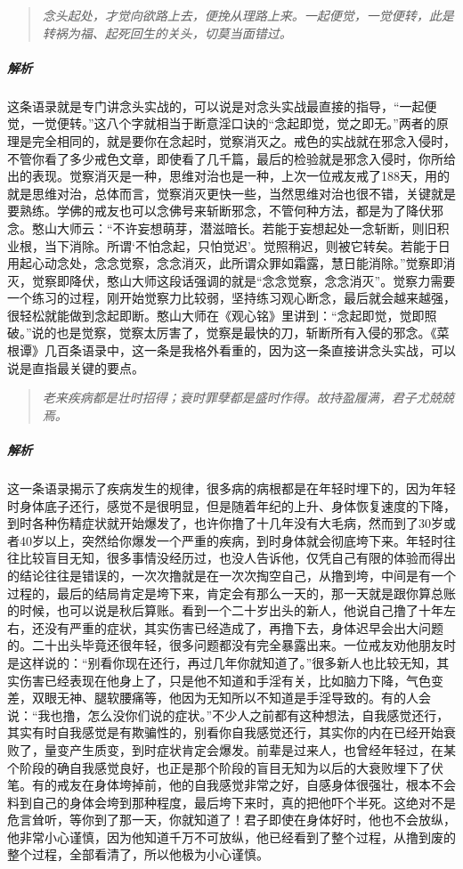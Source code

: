 \begin{quote}\it
    念头起处，才觉向欲路上去，便挽从理路上来。一起便觉，一觉便转，此是转祸为福、起死回生的关头，切莫当面错过。
\end{quote}

\subparagraph{解析} 这条语录就是专门讲念头实战的，可以说是对念头实战最直接的指导，“一起便觉，一觉便转。”这八个字就相当于断意淫口诀的“念起即觉，觉之即无。”两者的原理是完全相同的，就是要你在念起时，觉察消灭之。戒色的实战就在邪念入侵时，不管你看了多少戒色文章，即使看了几千篇，最后的检验就是邪念入侵时，你所给出的表现。觉察消灭是一种，思维对治也是一种，上次一位戒友戒了188天，用的就是思维对治，总体而言，觉察消灭更快一些，当然思维对治也很不错，关键就是要熟练。学佛的戒友也可以念佛号来斩断邪念，不管何种方法，都是为了降伏邪念。憨山大师云：“不许妄想萌芽，潜滋暗长。若能于妄想起处一念斩断，则旧积业根，当下消除。所谓‘不怕念起，只怕觉迟’。觉照稍迟，则被它转矣。若能于日用起心动念处，念念觉察，念念消灭，此所谓众罪如霜露，慧日能消除。”觉察即消灭，觉察即降伏，憨山大师这段话强调的就是“念念觉察，念念消灭”。觉察力需要一个练习的过程，刚开始觉察力比较弱，坚持练习观心断念，最后就会越来越强，很轻松就能做到念起即断。憨山大师在《观心铭》里讲到：“念起即觉，觉即照破。”说的也是觉察，觉察太厉害了，觉察是最快的刀，斩断所有入侵的邪念。《菜根谭》几百条语录中，这一条是我格外看重的，因为这一条直接讲念头实战，可以说是直指最关键的要点。

\begin{quote}\it
    老来疾病都是壮时招得；衰时罪孽都是盛时作得。故持盈履满，君子尤兢兢焉。
\end{quote}

\subparagraph{解析} 这一条语录揭示了疾病发生的规律，很多病的病根都是在年轻时埋下的，因为年轻时身体底子还行，感觉不是很明显，但是随着年纪的上升、身体恢复速度的下降，到时各种伤精症状就开始爆发了，也许你撸了十几年没有大毛病，然而到了30岁或者40岁以上，突然给你爆发一个严重的疾病，到时身体就会彻底垮下来。年轻时往往比较盲目无知，很多事情没经历过，也没人告诉他，仅凭自己有限的体验而得出的结论往往是错误的，一次次撸就是在一次次掏空自己，从撸到垮，中间是有一个过程的，最后的结局肯定是垮下来，肯定会有那么一天的，那一天就是跟你算总账的时候，也可以说是秋后算账。看到一个二十岁出头的新人，他说自己撸了十年左右，还没有严重的症状，其实伤害已经造成了，再撸下去，身体迟早会出大问题的。二十出头毕竟还很年轻，很多问题都没有完全暴露出来。一位戒友劝他朋友时是这样说的：“别看你现在还行，再过几年你就知道了。”很多新人也比较无知，其实伤害已经表现在他身上了，只是他不知道和手淫有关，比如脑力下降，气色变差，双眼无神、腿软腰痛等，他因为无知所以不知道是手淫导致的。有的人会说：“我也撸，怎么没你们说的症状。”不少人之前都有这种想法，自我感觉还行，其实有时自我感觉是有欺骗性的，别看你自我感觉还行，其实你的内在已经开始衰败了，量变产生质变，到时症状肯定会爆发。前辈是过来人，也曾经年轻过，在某个阶段的确自我感觉良好，也正是那个阶段的盲目无知为以后的大衰败埋下了伏笔。有的戒友在身体垮掉前，他的自我感觉非常之好，自感身体很强壮，根本不会料到自己的身体会垮到那种程度，最后垮下来时，真的把他吓个半死。这绝对不是危言耸听，等你到了那一天，你就知道了！君子即使在身体好时，他也不会放纵，他非常小心谨慎，因为他知道千万不可放纵，他已经看到了整个过程，从撸到废的整个过程，全部看清了，所以他极为小心谨慎。

